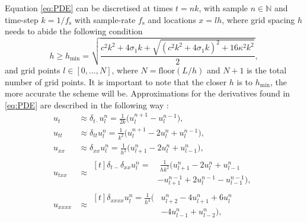 \documentclass[twoside,a4paper,dvipsnames]{article}
\begin{document}
Equation \eqref{eq:PDE} can be discretised at times $t = nk$, with sample $n \in \mathbb{N}$ and time-step $k = 1 / f_\text{s}$ with sample-rate $f_\text{s}$ and locations $x = lh$, where grid spacing $h$ needs to abide the following condition \cite{Bilbao2009}
\begin{equation}\label{eq:stability}
    h \geq h_\text{min} = \sqrt{\frac{c^2k^2+4 \sigma_1k+\sqrt{(c^2k^2+4\sigma_1k)^2+16\kappa^2k^2}}{2}},
\end{equation}
and grid points $l \in [0,...,N]$, where $N=\text{floor}(L/h)$ and $N + 1$ is the total number of grid points. It is important to note that the closer $h$ is to $h_\text{min}$, the more accurate the scheme will be. 
Approximations for the derivatives found in \eqref{eq:PDE} are described in the following way \cite{Bilbao2009}: 
\begin{subequations}\label{eq:approximations}
    \begin{align}
        \label{eq:centerTime}
        u_{t} &\approx \delta_{t\cdot} u^n_l = \frac{1}{2k}\big(u_l^{n+1}-u_l^{n-1}\big),\\
        \label{eq:secondTime}
        u_{tt} &\approx \delta_{tt}u_l^n = \frac{1}{k^2} \big(u_l^{n+1} - 2u_l^n + u_l^{n-1}\big),\\
        \label{eq:secondSpacex}
        u_{xx} &\approx \delta_{xx}u_l^n = \frac{1}{h^2}\big(u_{l+1}^n - 2u_l^n + u_{l-1}^n\big),\\
        u_{txx} &\approx 
        \begin{aligned}[t]\delta_{t-}\delta_{xx}u_l^n =& \; \frac{1}{hk^2}\big(u_{l+1}^n - 2u_l^n + u_{l-1}^n \\
        &- u_{l+1}^{n-1} + 2u_l^{n-1} - u_{l-1}^{n-1}\big),
        \end{aligned}\\
        \label{eq:fourthSpacex}
        u_{xxxx} &\approx\begin{aligned}[t] \delta_{xxxx}u_l^n = \frac{1}{h^4}\big(&u_{l+2}^n - 4u_{l+1}^n + 6u_l^n \\
        &- 4u_{l-1}^n +u_{l-2}^n\big),
        \end{aligned}
    \end{align}
\end{subequations}
\end{document}
